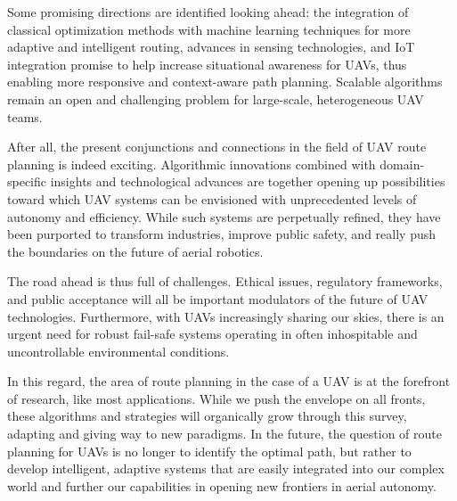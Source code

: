 \documentclass[conference]{IEEEtran}
\begin{document}
Some promising directions are identified looking ahead: the integration of classical optimization methods with machine learning techniques for more adaptive and intelligent routing, advances in sensing technologies, and IoT integration promise to help increase situational awareness for UAVs, thus enabling more responsive and context-aware path planning. Scalable algorithms remain an open and challenging problem for large-scale, heterogeneous UAV teams.

After all, the present conjunctions and connections in the field of UAV route planning is indeed exciting. Algorithmic innovations combined with domain-specific insights and technological advances are together opening up possibilities toward which UAV systems can be envisioned with unprecedented levels of autonomy and efficiency. While such systems are perpetually refined, they have been purported to transform industries, improve public safety, and really push the boundaries on the future of aerial robotics.

The road ahead is thus full of challenges. Ethical issues, regulatory frameworks, and public acceptance will all be important modulators of the future of UAV technologies. Furthermore, with UAVs increasingly sharing our skies, there is an urgent need for robust fail-safe systems operating in often inhospitable and uncontrollable environmental conditions.

In this regard, the area of route planning in the case of a UAV is at the forefront of research, like most applications. While we push the envelope on all fronts, these algorithms and strategies will organically grow through this survey, adapting and giving way to new paradigms. In the future, the question of route planning for UAVs is no longer to identify the optimal path, but rather to develop intelligent, adaptive systems that are easily integrated into our complex world and further our capabilities in opening new frontiers in aerial autonomy.
\end{document}
